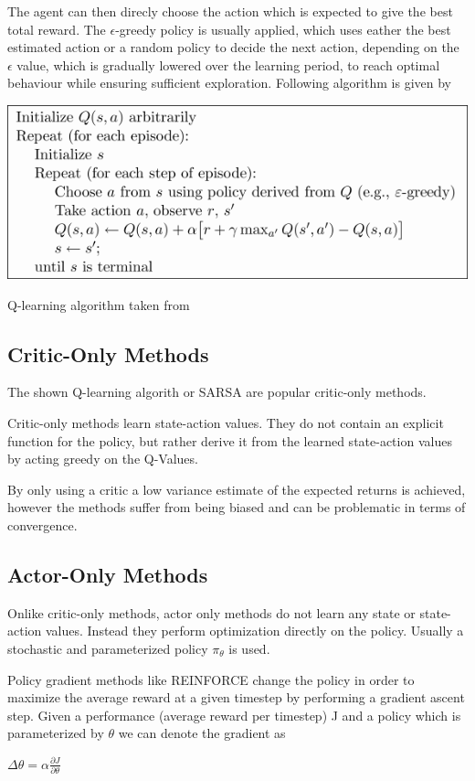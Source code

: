 The agent can then direcly choose the action which is expected to give the best total reward.
The $\epsilon$-greedy policy is usually applied, which uses eather the best estimated action or a random policy to decide the next action, depending on the $\epsilon$ value, which is gradually lowered over the learning period, to reach optimal behaviour while ensuring sufficient exploration.
Following algorithm is given by \citet{Sut98}

\includegraphics[scale=0.5]{bilder/qlearning2.png}

\caption{Q-learning algorithm taken from \citep{Sut98}}

\subsection{Critic-Only Methods}

The shown Q-learning algorith or SARSA are popular critic-only methods.

Critic-only methods learn state-action values. They do not contain an explicit function for the policy, but rather derive it from the learned state-action values by acting greedy on the Q-Values.

By only using a critic a low variance estimate of the expected returns is achieved, however the methods suffer from being biased and can be problematic in terms of convergence.

\subsection{Actor-Only Methods}

Onlike critic-only methods, actor only methods do not learn any state or state-action values.
Instead they perform optimization directly on the policy.
Usually a stochastic and parameterized policy $\pi_\theta$ is used.

Policy gradient methods like REINFORCE change the policy in order to maximize the average reward at a given timestep by performing a gradient ascent step. \citep{Williams1992}
Given a performance (average reward per timestep) J and a policy which is parameterized by $\theta$ we can denote the gradient as
\begin{center}
$\Delta \theta = \alpha \frac{\partial J}{\partial  \theta}$
\end{center}

